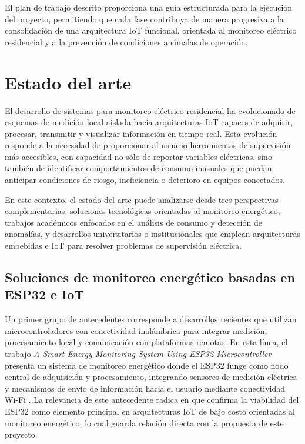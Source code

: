 ﻿\documentclass[12pt,openright,oneside]{report}
\theoremstyle{mytheoremstyle}
\theoremstyle{mytheoremstyle}
\theoremstyle{myproblemstyle}
\begin{document}
El plan de trabajo descrito proporciona una guía estructurada para la ejecución del proyecto, permitiendo que cada fase contribuya de manera progresiva a la consolidación de una arquitectura IoT funcional, orientada al monitoreo eléctrico residencial y a la prevención de condiciones anómalas de operación.

\chapter{Estado del arte}
\label{subsec:estado_arte}

El desarrollo de sistemas para monitoreo eléctrico residencial ha evolucionado de esquemas de medición local aislada hacia arquitecturas IoT capaces de adquirir, procesar, transmitir y visualizar información en tiempo real. Esta evolución responde a la necesidad de proporcionar al usuario herramientas de supervisión más accesibles, con capacidad no sólo de reportar variables eléctricas, sino también de identificar comportamientos de consumo inusuales que puedan anticipar condiciones de riesgo, ineficiencia o deterioro en equipos conectados.

En este contexto, el estado del arte puede analizarse desde tres perspectivas complementarias: soluciones tecnológicas orientadas al monitoreo energético, trabajos académicos enfocados en el análisis de consumo y detección de anomalías, y desarrollos universitarios o institucionales que emplean arquitecturas embebidas e IoT para resolver problemas de supervisión eléctrica.

\section{Soluciones de monitoreo energético basadas en ESP32 e IoT}

Un primer grupo de antecedentes corresponde a desarrollos recientes que utilizan microcontroladores con conectividad inalámbrica para integrar medición, procesamiento local y comunicación con plataformas remotas. En esta línea, el trabajo \textit{A Smart Energy Monitoring System Using ESP32 Microcontroller} presenta un sistema de monitoreo energético donde el ESP32 funge como nodo central de adquisición y procesamiento, integrando sensores de medición eléctrica y mecanismos de envío de información hacia el usuario mediante conectividad Wi-Fi \cite{smart-energy-esp32-2024}. La relevancia de este antecedente radica en que confirma la viabilidad del ESP32 como elemento principal en arquitecturas IoT de bajo costo orientadas al monitoreo energético, lo cual guarda relación directa con la propuesta de este proyecto.
\end{document}

